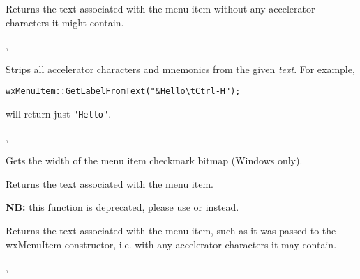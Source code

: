 \label{wxmenuitemgetlabel}


Returns the text associated with the menu item without any accelerator
characters it might contain.


, 


\label{wxmenuitemgetlabelfromtext}


Strips all accelerator characters and mnemonics from the given {\it text}.
For example,

\begin{verbatim}
wxMenuItem::GetLabelFromText("&Hello\tCtrl-H");
\end{verbatim}

will return just {\tt "Hello"}.


, 


\label{wxmenuitemgetmarginwidth}


Gets the width of the menu item checkmark bitmap (Windows only).


\label{wxmenuitemgetname}


Returns the text associated with the menu item.

{\bf NB:} this function is deprecated, please use 
 or  
instead.


\label{wxmenuitemgettext}


Returns the text associated with the menu item, such as it was passed to the
wxMenuItem constructor, i.e. with any accelerator characters it may contain.


, 


